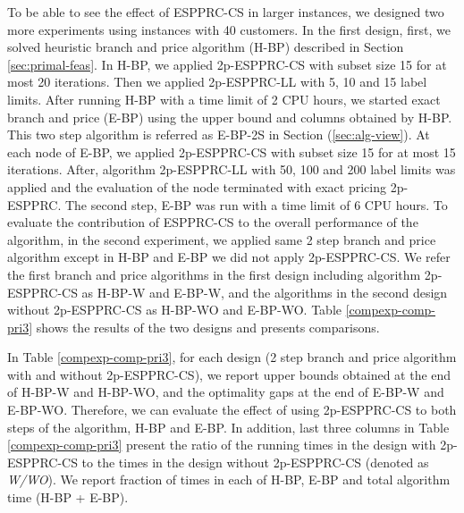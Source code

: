 To be able to see the effect of ESPPRC-CS in larger instances, we designed two more experiments
using instances with 40 customers. In the first design, first, we solved heuristic branch
and price algorithm (H-BP) described in Section \ref{sec:primal-feas}. In H-BP,
we applied 2p-ESPPRC-CS with subset size 15 for at most 20 iterations. Then we applied
2p-ESPPRC-LL with 5, 10 and 15 label limits. After running H-BP with a time limit of
2 CPU hours, we started exact branch and price (E-BP) using the upper bound and columns
obtained by H-BP. This two step algorithm is referred as  E-BP-2S  in Section (\ref{sec:alg-view}).
At each node of E-BP, we applied  2p-ESPPRC-CS with subset size 15 for at most 15 iterations.
After, algorithm 2p-ESPPRC-LL with 50, 100 and 200 label limits was applied and the evaluation
of the node terminated with exact pricing 2p-ESPPRC. The second step, E-BP was run with a time limit
of 6 CPU hours. To evaluate the contribution of ESPPRC-CS to the overall performance of the
algorithm, in the second experiment, we applied same 2 step branch and price algorithm
except in H-BP and E-BP we did not apply 2p-ESPPRC-CS. We refer the first branch and price
algorithms in the first design including algorithm 2p-ESPPRC-CS as H-BP-W and E-BP-W,
and the algorithms in the second design without 2p-ESPPRC-CS as H-BP-WO and E-BP-WO.
Table \ref{compexp-comp-pri3} shows the results of the two designs and presents comparisons.

In Table \ref{compexp-comp-pri3}, for each design (2 step branch and price algorithm with
and without 2p-ESPPRC-CS), we report upper bounds obtained at the end of H-BP-W and H-BP-WO,
and the optimality gaps at the end of E-BP-W and E-BP-WO. Therefore, we
can evaluate the effect of using 2p-ESPPRC-CS to both steps of the algorithm, H-BP and E-BP.
In addition, last three columns in Table \ref{compexp-comp-pri3} present the ratio of the
running times in the design with 2p-ESPPRC-CS to the times in the design without 2p-ESPPRC-CS
(denoted as {\em W/WO}). We report fraction of times in each of H-BP, E-BP and total
algorithm time (H-BP + E-BP).

